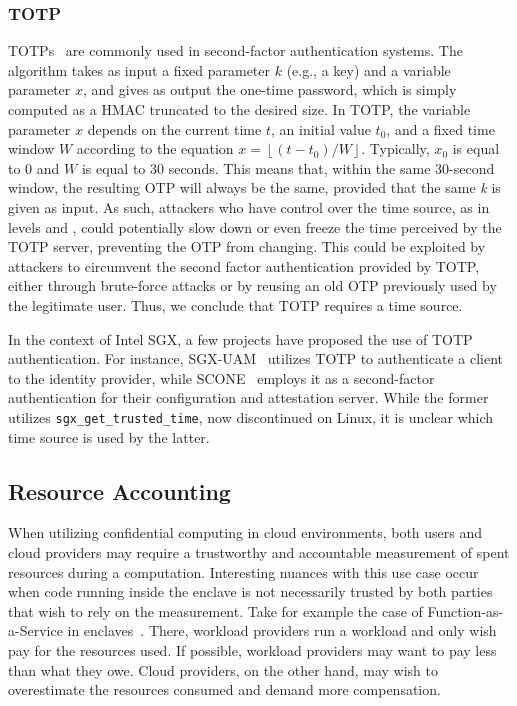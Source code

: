 \documentclass[sigplan,10pt]{acmart}
\begin{document}
\subsubsection*{TOTP}
%
\Acp{TOTP}~\cite{rfc6238} are commonly used in second-factor
authentication systems. The algorithm takes as input a fixed parameter $k$ (e.g., a
key) and a variable parameter $x$, and gives as output the one-time password,
which is simply computed as a HMAC truncated to the desired size. In \ac{TOTP},
the variable parameter $x$ depends on the current time $t$, an initial value
$t_0$, and a fixed time window $W$ according to the equation $x = \left\lfloor(t
- t_0)/W\right\rfloor$. Typically, $x_0$ is equal to 0 and $W$ is equal to 30
seconds. This means that, within the same 30-second window, the resulting OTP
will always be the same, provided that the same \emph{k} is given as input. As
such, attackers who have control over the time source, as in levels \Tzero and
\Tone, could potentially slow down or even freeze the time perceived by the
\ac{TOTP} server, preventing the OTP from changing. This could be exploited by
attackers to circumvent the second factor authentication provided by \ac{TOTP},
either through brute-force attacks or by reusing an old OTP previously used by
the legitimate user. Thus, we conclude that \ac{TOTP} %
requires a \Ttwo time source.

In the context of Intel SGX, a few projects have proposed the use of \ac{TOTP} authentication.
For instance, SGX-UAM~\cite{wu2021sgx} utilizes \ac{TOTP} to authenticate a
client to the identity provider, while SCONE~\cite{scone2fa} employs it as
a second-factor authentication for their configuration and attestation server.
While the former utilizes \texttt{sgx\_get\_trusted\_time}, now
discontinued on Linux, it is unclear which time source is used by the latter.

\subsection{Resource Accounting}

When utilizing confidential computing in cloud environments, both users and
cloud providers may require a trustworthy and accountable measurement of spent
resources during a computation. Interesting nuances with this use case occur
when code running inside the enclave is not necessarily trusted by both parties
that wish to rely on the measurement.
Take for example the case of
Function-as-a-Service in enclaves~\cite{sfaas}. There, workload providers run a workload and only wish pay for the resources used. If possible, workload providers may want to pay less than what they owe. Cloud providers, on the other hand, may wish to overestimate the
resources consumed and demand more compensation.
\end{document}
